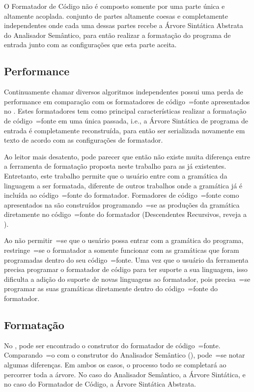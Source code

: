 O Formatador de Código não é composto somente por uma parte única e
altamente acoplada.
 conjunto de partes altamente coesas e
completamente independentes onde cada uma dessas partes recebe a Árvore Sintática Abstrata do Analisador Semântico,
para então realizar a formatação do programa de entrada junto com as configurações que esta parte aceita.


\subsection{Performance}
\label{performanceDoFormator}

Continuamente chamar diversos algoritmos independentes possui uma perda de performance em comparação com os formatadores de código~=fonte apresentados no .
Estes formatadores tem como principal características realizar a formatação de código~=fonte em uma única passada,
i.e.,
a Árvore Sintática de programa de entrada é completamente reconstruída,
para então ser serializada novamente em texto de acordo com as configurações de formatador.

Ao leitor mais desatento,
pode parecer que então não existe muita diferença entre a ferramenta de formatação proposta neste trabalho para as já existentes.
Entretanto,
este trabalho permite que o usuário entre com a gramática da linguagem a ser formatada,
diferente de outros trabalhos onde a gramática já é incluída ao código~=fonte do formatador.
Formadores de código~=fonte como apresentados na  são construídos programando~=se as produções da gramática diretamente no código~=fonte do formatador (Descendentes Recursivos,
reveja a ).

Ao não permitir~=se que o usuário possa entrar com a gramática do programa,
restringe~=se o formatador a somente funcionar com as gramáticas que foram programadas dentro do seu código~=fonte.
Uma vez que o usuário da ferramenta precisa programar o formatador de código para ter suporte a sua linguagem,
isso dificulta a adição do suporte de novas linguagens ao formatador,
pois precisa~=se programar as suas gramáticas diretamente dentro do código~=fonte do formatador.


\subsection{Formatação}

No ,
pode ser encontrado o construtor do formatador de código~=fonte.
Comparando~=o com o construtor do Analisador Semântico (),
pode~=se notar algumas diferenças.
Em ambos os casos,
o processo todo se completará ao percorrer toda a árvore.
No caso do Analisador Semântico,
a Árvore Sintática,
e no caso do Formatador de Código,
a Árvore Sintática Abstrata.


